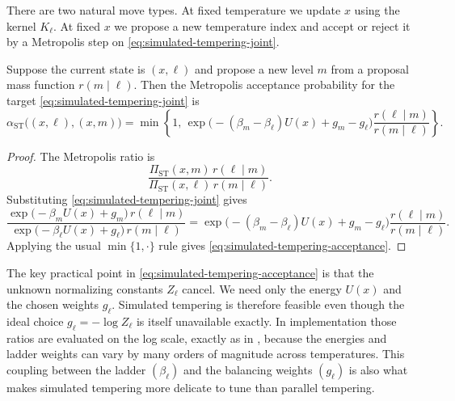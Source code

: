 There are two natural move types.
At fixed temperature we update $x$ using the kernel $K_\ell$.
At fixed $x$ we propose a new temperature index and accept or reject it by a Metropolis step on \eqref{eq:simulated-tempering-joint}.

\begin{proposition}
\label{prop:simulated-tempering-acceptance}
Suppose the current state is $(x,\ell)$ and propose a new level $m$ from a proposal mass function $r(m\mid \ell)$.
Then the Metropolis acceptance probability for the target \eqref{eq:simulated-tempering-joint} is
\begin{equation}
  \alpha_{\mathrm{ST}}\bigl((x,\ell),(x,m)\bigr)
  =
  \min\!\left\{
    1,\,
    \exp\!\bigl(-(\beta_m-\beta_\ell)U(x) + g_m-g_\ell\bigr)
    \frac{r(\ell\mid m)}{r(m\mid \ell)}
  \right\}.
  \label{eq:simulated-tempering-acceptance}
\end{equation}
\end{proposition}
\begin{proof}
The Metropolis ratio is
\[
  \frac{\Pi_{\mathrm{ST}}(x,m)\,r(\ell\mid m)}{\Pi_{\mathrm{ST}}(x,\ell)\,r(m\mid \ell)}.
\]
Substituting \eqref{eq:simulated-tempering-joint} gives
\[
  \frac{
    \exp\!\bigl(-\beta_m U(x)+g_m\bigr)\,r(\ell\mid m)
  }{
    \exp\!\bigl(-\beta_\ell U(x)+g_\ell\bigr)\,r(m\mid \ell)
  }
  =
  \exp\!\bigl(-(\beta_m-\beta_\ell)U(x)+g_m-g_\ell\bigr)
  \frac{r(\ell\mid m)}{r(m\mid \ell)}.
\]
Applying the usual $\min\{1,\cdot\}$ rule gives \eqref{eq:simulated-tempering-acceptance}.%
\end{proof}

The key practical point in \eqref{eq:simulated-tempering-acceptance} is that the unknown normalizing constants $Z_\ell$ cancel.
We need only the energy $U(x)$ and the chosen weights $g_\ell$.
Simulated tempering is therefore feasible even though the ideal choice $g_\ell=-\log Z_\ell$ is itself unavailable exactly.
In implementation those ratios are evaluated on the log scale, exactly as in , because the energies and ladder weights can vary by many orders of magnitude across temperatures.
This coupling between the ladder $(\beta_\ell)$ and the balancing weights $(g_\ell)$ is also what makes simulated tempering more delicate to tune than parallel tempering.

